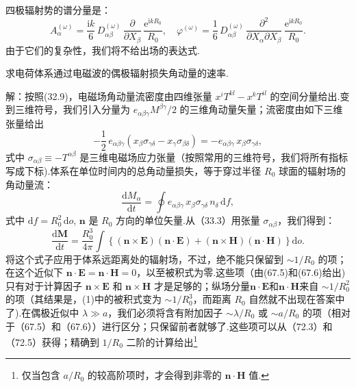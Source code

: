 \begin{xiti}
四极辐射势的谱分量是：
\begin{equation*}
  A_\alpha^{(\omega)}=\frac{\mathrm{i}k}{6}\,D_{\alpha\beta}^{(\omega)}\,\frac{\partial}{\partial X_\beta}\,\frac{\mathrm{e}^{\mathrm{i}kR_0}}{R_0},\quad
  \varphi^{(\omega)}=\frac{1}{6}\,D_{\alpha\beta}^{(\omega)}\,\frac{\partial^2}{\partial X_\alpha\partial X_\beta}\,\frac{\mathrm{e}^{\mathrm{i}kR_0}}{R_0}.
\end{equation*}
由于它们的复杂性，我们将不给出场的表达式.

\quad 求电荷体系通过电磁波的偶极辐射损失角动量的速率.

解：按照(32.9)，电磁场角动量流密度由四维张量 $x^iT^{kl}-x^kT^{il}$ 的空间分量给出.变到三维符号，我们引入分量为 $e_{\alpha\beta\gamma}M^{\beta\gamma}/2$ 的三维角动量矢量；流密度由如下三维张量给出
\begin{equation*}
  -\frac{1}{2}\,e_{\alpha\beta\gamma}(x_\beta\sigma_{\gamma\delta}-x_\gamma\sigma_{\beta\delta})=-e_{\alpha\beta\gamma}\,x_\beta\sigma_{\gamma\delta},
\end{equation*}
式中 $\sigma_{\alpha\beta}\equiv-T^{\alpha\beta}$ 是三维电磁场应力张量（按照常用的三维符号，我们将所有指标写成下标).体系在单位时间内的总角动量损失，等于穿过半径 $R_0$ 球面的辐射场的角动量流：
\begin{equation*}
  \frac{\mathrm{d}M_\alpha}{\mathrm{d}t}=\oint e_{\alpha\beta\gamma}\,x_\beta\sigma_{\gamma\delta}\,n_\delta\,\mathrm{d}f,
\end{equation*}
式中 $\mathrm{d}f=R_0^2\,\mathrm{d}o$, $\boldsymbol{n}$ 是 $R_0$ 方向的单位矢量.从（33.3）用张量 $\sigma_{\alpha\beta}$，我们得到：
\begin{equation*}
  \frac{\mathrm{d}\boldsymbol{M}}{\mathrm{d}t}=\frac{R_0^3}{4\pi}\int\left\{(\boldsymbol{n}\times\boldsymbol{E})(\boldsymbol{n}\cdot\boldsymbol{E})+(\boldsymbol{n}\times\boldsymbol{H})(\boldsymbol{n}\cdot\boldsymbol{H})\right\}\mathrm{d}o.\tag{1}
\end{equation*}
将这个式子应用于体系远距离处的辐射场，不过，绝不能只保留到 $\sim 1/R_0$ 的项；在这个近似下 $\boldsymbol{n}\cdot\boldsymbol{E}=\boldsymbol{n}\cdot\boldsymbol{H}=0$，以至被积式为零.这些项（由(67.5)和(67.6)给出)只有对于计算因子 $\boldsymbol{n}\times\boldsymbol{E}$ 和 $\boldsymbol{n}\times\boldsymbol{H}$ 才是足够的；纵场分量$\boldsymbol{n}\cdot\boldsymbol{E}$和$\boldsymbol{n}\cdot\boldsymbol{H}$来自 $\sim 1/R_0^2$ 的项（其结果是，(1)中的被积式变为 $\sim 1/R_0^3$，而距离 $R_0$ 自然就不出现在答案中了).在偶极近似中 $\lambda\gg a$，我们必须将含有附加因子 $\sim \lambda/R_0$ 或 $\sim a/R_0$ 的项（相对于（67.5）和（67.6））进行区分；只保留前者就够了.这些项可以从（72.3）和（72.5）获得；精确到 $1/R_0$ 二阶的计算给出\footnote{仅当包含 $a/R_0$ 的较高阶项时，才会得到非零的 $\boldsymbol{n}\cdot\boldsymbol{H}$ 值.}

\end{xiti}
